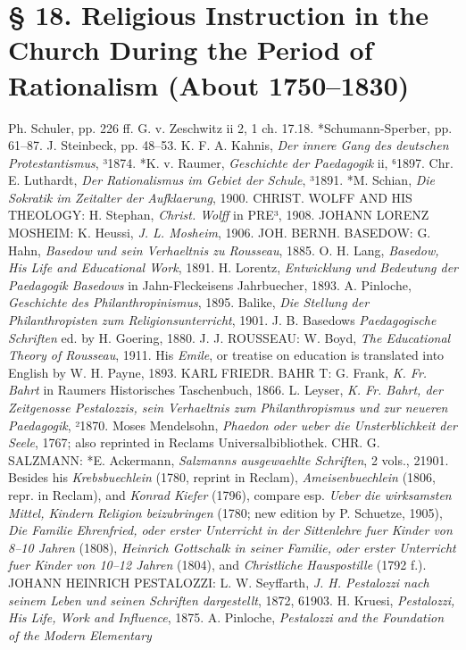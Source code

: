 \section[§ 18. The Period of Rationalism]{§ 18. Religious Instruction in the Church During the Period of Rationalism (About 1750–1830)}

Ph. Schuler, pp. 226 ff. G. v. Zeschwitz ii 2, 1 ch. 17.18. *Schumann-Sperber, pp. 61–87. J. Steinbeck, pp. 48–53. K. F. A. Kahnis, \emph{Der innere Gang des deutschen Protestantismus}, ³1874. *K. v. Raumer, \emph{Geschichte der Paedagogik} ii, ⁶1897. Chr. E. Luthardt, \emph{Der Rationalismus im Gebiet der Schule}, ³1891. *M. Schian, \emph{Die Sokratik im Zeitalter der Aufklaerung}, 1900. CHRIST. WOLFF AND HIS THEOLOGY: H. Stephan, \emph{Christ. Wolff} in PRE³, 1908. JOHANN LORENZ MOSHEIM: K. Heussi, \emph{J. L. Mosheim}, 1906. JOH. BERNH. BASEDOW: G. Hahn, \emph{Basedow und sein Verhaeltnis zu Rousseau}, 1885. O. H. Lang, \emph{Basedow, His Life and Educational Work}, 1891. H. Lorentz, \emph{Entwicklung und Bedeutung der Paedagogik Basedows} in Jahn-Fleckeisens Jahrbuecher, 1893. A. Pinloche, \emph{Geschichte des Philanthropinismus}, 1895. Balike, \emph{Die Stellung der Philanthropisten zum Religionsunterricht}, 1901. J. B. Basedows \emph{Paedagogische Schriften} ed. by H. Goering, 1880. J. J. ROUSSEAU: W. Boyd, \emph{The Educational Theory of Rousseau}, 1911. His \emph{Emile}, or treatise on education is translated into English by W. H. Payne, 1893. KARL FRIEDR. BAHR T: G. Frank, \emph{K. Fr. Bahrt} in Raumers Historisches Taschenbuch, 1866. L. Leyser, \emph{K. Fr. Bahrt, der Zeitgenosse Pestalozzis, sein Verhaeltnis zum Philanthropismus und zur neueren Paedagogik}, ²1870. Moses Mendelsohn, \emph{Phaedon oder ueber die Unsterblichkeit der Seele}, 1767; also reprinted in Reclams Universalbibliothek. CHR. G. SALZMANN: *E. Ackermann, \emph{Salzmanns ausgewaehlte Schriften}, 2 vols., 21901. Besides his \emph{Krebsbuechlein} (1780, reprint in Reclam), \emph{Ameisenbuechlein} (1806, repr. in Reclam), and \emph{Konrad Kiefer} (1796), compare esp. \emph{Ueber die wirksamsten Mittel, Kindern Religion beizubringen} (1780; new edition by P. Schuetze, 1905), \emph{Die Familie Ehrenfried, oder erster Unterricht in der Sittenlehre fuer Kinder von 8–10 Jahren} (1808), \emph{Heinrich Gottschalk in seiner Familie, oder erster Unterricht fuer Kinder von 10–12 Jahren} (1804), and \emph{Christliche Hauspostille} (1792 f.). JOHANN HEINRICH PESTALOZZI: L. W. Seyffarth, \emph{J. H. Pestalozzi nach seinem Leben und seinen Schriften dargestellt}, 1872, 61903. H. Kruesi, \emph{Pestalozzi, His Life, Work and Influence}, 1875. A. Pinloche, \emph{Pestalozzi and the Foundation of the Modern Elementary}
